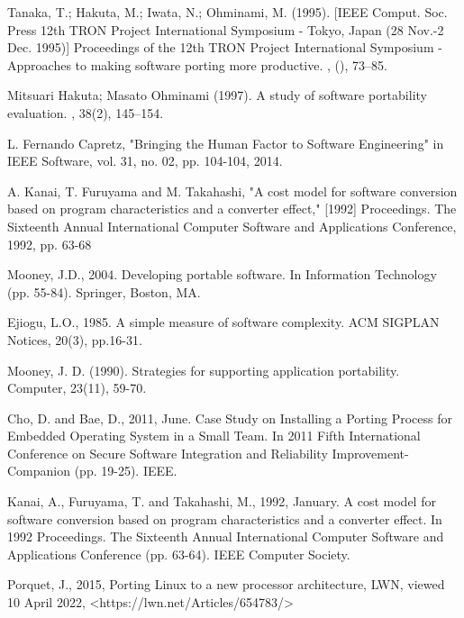\begin{flushleft}
    \begin{thebibliography}{99}

    Tanaka, T.; Hakuta, M.; Iwata, N.; Ohminami, M. (1995).
    [IEEE Comput. Soc. Press 12th TRON Project International Symposium - Tokyo, Japan (28 Nov.-2 Dec. 1995)]
    Proceedings of the 12th TRON Project International Symposium - Approaches to making software porting more productive. , (), 73–85.

    Mitsuari Hakuta; Masato Ohminami (1997).
    A study of software portability evaluation. , 38(2), 145–154.

    L. Fernando Capretz,
    "Bringing the Human Factor to Software Engineering"
    in IEEE Software, vol. 31, no. 02, pp. 104-104, 2014.

    A. Kanai, T. Furuyama and M. Takahashi,
    "A cost model for software conversion based on program characteristics and a converter effect,"
    [1992] Proceedings. The Sixteenth Annual International Computer Software and Applications Conference, 1992, pp. 63-68

    Mooney, J.D., 2004.
    Developing portable software.
    In Information Technology (pp. 55-84). Springer, Boston, MA.

    Ejiogu, L.O., 1985.
    A simple measure of software complexity.
    ACM SIGPLAN Notices, 20(3), pp.16-31.

    Mooney, J. D. (1990).
    Strategies for supporting application portability.
    Computer, 23(11), 59-70.

    Cho, D. and Bae, D., 2011, June.
    Case Study on Installing a Porting Process for Embedded Operating System in a Small Team.
    In 2011 Fifth International Conference on Secure Software Integration and Reliability Improvement-Companion (pp. 19-25). IEEE.

    Kanai, A., Furuyama, T. and Takahashi, M., 1992, January.
    A cost model for software conversion based on program characteristics and a converter effect.
    In 1992 Proceedings. The Sixteenth Annual International Computer Software and Applications Conference (pp. 63-64). IEEE Computer Society.

    Porquet, J., 2015,
    Porting Linux to a new processor architecture,
    LWN,
    viewed 10 April 2022,
    <https://lwn.net/Articles/654783/>


\end{thebibliography}
\end{flushleft}
